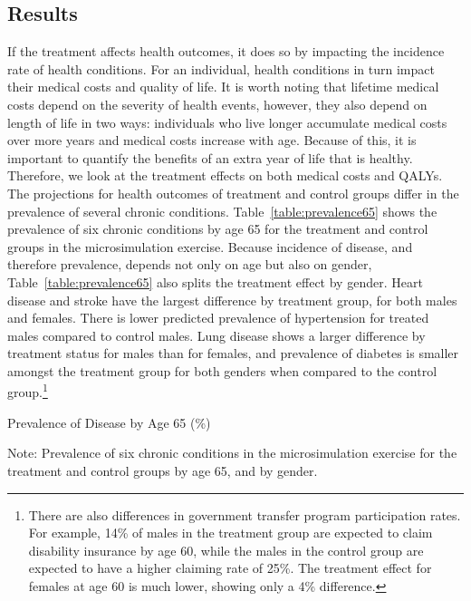 \subsection{Results}

\noindent If the treatment affects health outcomes, it does so by impacting the incidence rate of health conditions. For an individual, health conditions in turn impact their medical costs and quality of life. It is worth noting that lifetime medical costs depend on the severity of health events, however, they also depend on length of life in two ways: individuals who live longer accumulate medical costs over more years and medical costs increase with age. Because of this, it is important to quantify the benefits of an extra year of life that is healthy. Therefore, we look at the treatment effects on both medical costs and QALYs. \\

\noindent The projections for health outcomes of treatment and control groups differ in the prevalence of several chronic conditions. Table~\ref{table:prevalence65} shows the prevalence of six chronic conditions by age 65 for the treatment and control groups in the microsimulation exercise. Because incidence of disease, and therefore prevalence, depends not only on age but also on gender, Table~\ref{table:prevalence65} also splits the treatment effect by gender. Heart disease and stroke have the largest difference by treatment group, for both males and females. There is lower predicted prevalence of hypertension for treated males compared to control males. Lung disease shows a larger difference by treatment status for males than for females, and prevalence of diabetes is smaller amongst the treatment group for both genders when compared to the control group.\footnote{There are also differences in government transfer program participation rates. For example, 14\% of males in the treatment group are expected to claim disability insurance by age 60, while the males in the control group are expected to have a higher claiming rate of 25\%. The treatment effect for females at age 60 is much lower, showing only a 4\% difference.} \\

\begin{table}[H]
\begin{threeparttable}
\footnotesize
\caption{Prevalence of Disease by Age 65 (\%)} \label{table:prevalence65}

\begin{tablenotes}
\footnotesize
\item Note: Prevalence of six chronic conditions in the microsimulation exercise for the treatment and control groups by age 65, and by gender.
\end{tablenotes}
\end{threeparttable}
\end{table}

